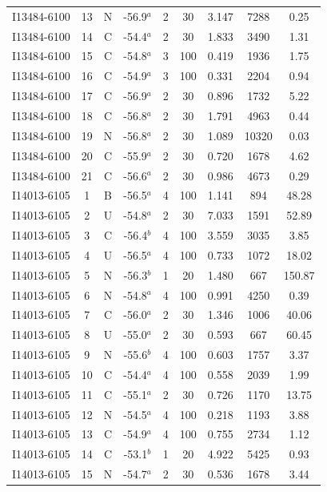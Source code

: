 \begin{table}
\begin{tabular}{ccccccccc}
I13484-6100 & 13 & N & -56.9$^{a}$ & 2 & 30 & 3.147 & 7288 & 0.25 \\
I13484-6100 & 14 & C & -54.4$^{a}$ & 2 & 30 & 1.833 & 3490 & 1.31 \\
I13484-6100 & 15 & C & -54.8$^{a}$ & 3 & 100 & 0.419 & 1936 & 1.75 \\
I13484-6100 & 16 & C & -54.9$^{a}$ & 3 & 100 & 0.331 & 2204 & 0.94 \\
I13484-6100 & 17 & C & -56.9$^{a}$ & 2 & 30 & 0.896 & 1732 & 5.22 \\
I13484-6100 & 18 & C & -56.8$^{a}$ & 2 & 30 & 1.791 & 4963 & 0.44 \\
I13484-6100 & 19 & N & -56.8$^{a}$ & 2 & 30 & 1.089 & 10320 & 0.03 \\
I13484-6100 & 20 & C & -55.9$^{a}$ & 2 & 30 & 0.720 & 1678 & 4.62 \\
I13484-6100 & 21 & C & -56.6$^{a}$ & 2 & 30 & 0.986 & 4673 & 0.29 \\
I14013-6105 & 1 & B & -56.5$^{a}$ & 4 & 100 & 1.141 & 894 & 48.28 \\
I14013-6105 & 2 & U & -54.8$^{a}$ & 2 & 30 & 7.033 & 1591 & 52.89 \\
I14013-6105 & 3 & C & -56.4$^{b}$ & 4 & 100 & 3.559 & 3035 & 3.85 \\
I14013-6105 & 4 & U & -56.5$^{a}$ & 4 & 100 & 0.733 & 1072 & 18.02 \\
I14013-6105 & 5 & N & -56.3$^{b}$ & 1 & 20 & 1.480 & 667 & 150.87 \\
I14013-6105 & 6 & N & -54.8$^{a}$ & 4 & 100 & 0.991 & 4250 & 0.39 \\
I14013-6105 & 7 & C & -56.0$^{a}$ & 2 & 30 & 1.346 & 1006 & 40.06 \\
I14013-6105 & 8 & U & -55.0$^{a}$ & 2 & 30 & 0.593 & 667 & 60.45 \\
I14013-6105 & 9 & N & -55.6$^{b}$ & 4 & 100 & 0.603 & 1757 & 3.37 \\
I14013-6105 & 10 & C & -54.4$^{a}$ & 4 & 100 & 0.558 & 2039 & 1.99 \\
I14013-6105 & 11 & C & -55.1$^{a}$ & 2 & 30 & 0.726 & 1170 & 13.75 \\
I14013-6105 & 12 & N & -54.5$^{a}$ & 4 & 100 & 0.218 & 1193 & 3.88 \\
I14013-6105 & 13 & C & -54.9$^{a}$ & 4 & 100 & 0.755 & 2734 & 1.12 \\
I14013-6105 & 14 & C & -53.1$^{b}$ & 1 & 20 & 4.922 & 5425 & 0.93 \\
I14013-6105 & 15 & N & -54.7$^{a}$ & 2 & 30 & 0.536 & 1678 & 3.44 \\

\end{tabular}
\end{table}
